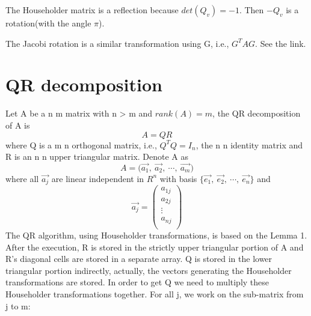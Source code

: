 The Householder matrix is a reflection because \(det(Q_v) = -1\). Then \(-Q_v\) is a rotation(with the angle \(\pi\)).

The Jacobi rotation is a similar transformation using G, i.e., \(G^TAG\). See the link.
\section{QR decomposition}
Let A be a n \texttimes m matrix with n > m and \(rank(A) = m\), the QR decomposition of A is \[ A = Q R \] where Q is a m \texttimes n orthogonal matrix, i.e., \(Q^TQ = I_n\), the n \texttimes n identity matrix and R is an n \texttimes n upper triangular matrix. Denote A as \[A = \bigl(\vec{a_1},\ \vec{a_2},\ \cdots,\ \vec{a_m}\bigr)\] where all \(\vec{a_j}\) are linear independent in \(R^n\) with basis $\bigl\{\vec{e_1},\ \vec{e_2},\ \cdots,\ \vec{e_n}\bigr\}$ and 
\[ \vec{a_j} = \left( \begin{array}{c} a_{1j}\\ a_{2j}\\ \vdots\\ a_{nj}\\ \end{array} \right) \] The QR algorithm, using Householder transformations, is based on the Lemma 1. After the execution, R is stored in the strictly upper triangular portion of A and R's diagonal cells are stored in a separate array. Q is stored in the lower triangular portion indirectly, actually, the vectors generating the Householder transformations are stored. In order to get Q we need to multiply these Householder transformations together. For all j, we work on the sub-matrix from j to m:
